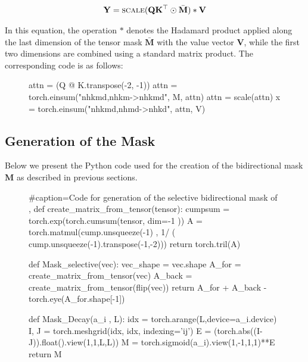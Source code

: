 \begin{align}
   \mathbf{Y} = \textsc{scale}(\mathbf{Q}\mathbf{K}^{\top} \odot \bar{\mathbf{M}}) * \mathbf{V}
\end{align}

In this equation, the operation \( * \) denotes the Hadamard product applied along the last dimension of the tensor mask \(\bar{\mathbf{M}}\) with the value vector \(\mathbf{V}\), while the first two dimensions are combined using a standard matrix product. The corresponding code is as follows:

\begin{figure}[t]
\hspace{5mm}\begin{minipage}[t]{0.95\columnwidth} 
    \centering
    \begin{python}[framerule=0.3
    mm , rulecolor=\color{black} ,frame=single]
attn = (Q @ K.transpose(-2, -1))
attn = torch.einsum("nhkmd,nhkm->nhkmd", M, attn)
attn = scale(attn)
x = torch.einsum("nhkmd,nhmd->nhkd", attn, V)
\end{python}
\end{minipage}
\end{figure}


\subsection{Generation of the Mask}
\label{subsec:code}
Below we present the Python code used for the creation of the bidirectional mask $\mathbf{M}$ as described in previous sections. 

\begin{figure}[t]
\hspace{5mm}\begin{minipage}[t]{0.95\columnwidth} 
    \centering
    \begin{python}[framerule=0.3
    mm , rulecolor=\color{black} ,frame=single]
#caption=Code for generation of the selective bidirectional mask of \lion , 
def create_matrix_from_tensor(tensor):
    cumpsum = torch.exp(torch.cumsum(tensor, dim=-1 ))
    A = torch.matmul(cump.unsqueeze(-1) , 1/ ( cump.unsqueeze(-1).transpose(-1,-2)))
    return torch.tril(A)

def Mask_selective(vec):
    vec_shape = vec.shape
    A_for = create_matrix_from_tensor(vec)
    A_back = create_matrix_from_tensor(flip(vec))
    return A_for + A_back - torch.eye(A_for.shape[-1])

def Mask_Decay(a_i , L):
    idx = torch.arange(L,device=a_i.device)
    I, J = torch.meshgrid(idx, idx, indexing='ij')
    E = (torch.abs((I-J)).float().view(1,1,L,L))
    M = torch.sigmoid(a_i).view(1,-1,1,1)**E
    return M

\end{python}
\end{minipage}
\end{figure}

